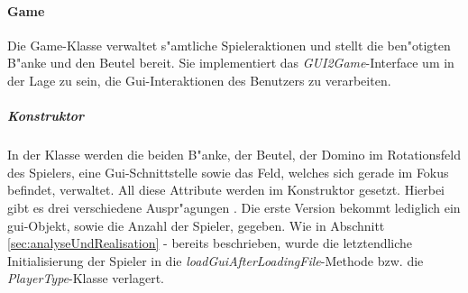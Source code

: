 \paragraph{Game}
\label{par:game}
Die Game-Klasse verwaltet s"amtliche Spieleraktionen und stellt die ben"otigten B"anke und den Beutel bereit. Sie implementiert das \emph{GUI2Game}-Interface um in der Lage zu sein, die Gui-Interaktionen des Benutzers zu verarbeiten. 

\subparagraph{Konstruktor}
In der Klasse werden die beiden B"anke, der Beutel, der Domino im Rotationsfeld des Spielers, eine Gui-Schnittstelle sowie das Feld, welches sich gerade im Fokus befindet, verwaltet. All diese Attribute werden im Konstruktor gesetzt. Hierbei gibt es drei verschiedene Auspr"agungen . Die erste Version bekommt lediglich ein gui-Objekt, sowie die Anzahl der Spieler, gegeben. Wie in Abschnitt \ref{sec:analyseUndRealisation} -  bereits beschrieben, wurde die letztendliche Initialisierung der Spieler in die \emph{loadGuiAfterLoadingFile}-Methode bzw. die \emph{PlayerType}-Klasse verlagert. 

